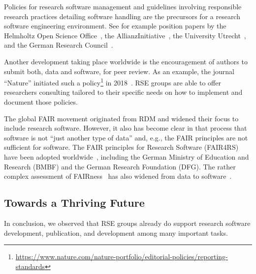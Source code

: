 \documentclass[a4paper]{article}
\begin{document}
Policies for research software management and guidelines involving responsible research practices detailing software handling are the precursors for a research software engineering environment.
See for example position papers by the Helmholtz Open Science Office~\autocite{Helmholtz2019a,Helmholtz2019b},
the AllianzInitiative~\autocite{Konrad2021},
the University Utrecht~\autocite{Utrecht2016b},
and the German Research Council~\autocite{dfg_gsp}.

Another development taking place worldwide is the encouragement of authors to submit both, data and software, for peer review.
As an example, the journal “Nature” initiated such a policy\footnote{\url{https://www.nature.com/nature-portfolio/editorial-policies/reporting-standards}} in 2018~\autocite{Nature2018}.
RSE groups are able to offer researchers consulting tailored to their specific needs on how to implement and document those policies.

The global FAIR movement originated from RDM and widened their focus to include research software.
However, it also has become clear in that process that software is not “just another type of data” and, e.g., the FAIR principles are not sufficient for software.
The FAIR principles for Research Software (FAIR4RS)~\autocite{ChueHong2022} have been adopted worldwide~\autocite{Barker2024}, including the German Ministry of Education and Research (BMBF) and the German Research Foundation (DFG).
The rather complex assessment of FAIRness~\autocite{Wilkinson2023,FAIRmaturity} has also widened from data to software~\autocite{Lamprecht2020}.


\subsection{Towards a Thriving Future}

In conclusion, we observed that RSE groups already do support research software development, publication, and development among many important tasks.
\end{document}
